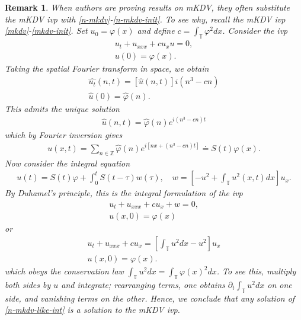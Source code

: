\documentclass[12pt,reqno]{amsart}
\numberwithin{equation}{section}  %
\newcommand{\zz}{\mathbb{Z}}
\newcommand{\ci}{\mathbb{T}}
\newcommand{\wh}{\widehat}
\newcommand{\p}{\partial}
\newcommand{\vp}{\varphi}
\newtheorem{remark}[theorem]{Remark}
\begin{document}
\section{}
\begin{remark}
  When authors are proving results on mKDV, they often substitute the mKDV ivp
  with \eqref{n-mkdv}-\eqref{n-mkdv-init}. To see why, recall the mKDV ivp
  \eqref{mkdv}-\eqref{mkdv-init}. Set $u_{0} = \vp(x)$ and define $c =
  \int_{\ci} \vp^{2} dx$. Consider the ivp
  \begin{gather*}
    u_{t} + u_{xxx} + c u_{x} u = 0,
    \\
    u(0) = \vp(x).
  \end{gather*}
 Taking the spatial Fourier transform in space, we obtain
 \begin{gather*}
   \wh{u_{t}}(n, t) = \left[ \wh{u}(n,t) \right]i\left( n^{3} - cn \right)
   \\
   \wh{u}(0) = \wh{\vp}(n).
 \end{gather*}
 This admits the unique solution
 \begin{equation*}
 \begin{split}
   \wh{u}(n,t) = \wh{\vp}(n) e^{i\left( n^{3} - cn \right)t}
 \end{split}
 \end{equation*}
 which by Fourier inversion gives
 \begin{equation*}
 \begin{split}
   u(x,t) = \sum_{n \in \zz} \wh{\vp}(n) e^{i\left[ nx + \left( n^{3} - cn
   \right)t \right]} \doteq S(t)\vp(x).
 \end{split}
 \end{equation*}
Now consider the integral equation
%
%
\begin{equation}
  \label{n-mkdv-like-int}
\begin{split}
  u(t) = S(t)\vp + \int_{0}^{t} S(t- \tau) w(\tau), \quad w =\left[
  -u^{2} + \int_{\ci} u^{2}(x,t) dx
  \right] u_{x}.
\end{split}
\end{equation}
%
%
By Duhamel's principle, this is the integral formulation of the ivp
\begin{gather*}
  u_{t} + u_{xxx} + c u_{x} + w = 0,
  \\
  u(x,0) = \vp(x)
\end{gather*}
or
\begin{gather*}
  u_{t} + u_{xxx} + c u_{x} = \left[ \int_{\ci} u^{2} dx - u^{2}
  \right]u_{x}
  \\
  u(x,0) = \vp(x).
\end{gather*}
which obeys the conservation law $\int_{\ci}u^{2} dx = \int_{\ci} \vp(x)^{2}
dx$. To see this, multiply both sides by $u$ and integrate; rearranging terms,
one obtains $\p_{t} \int_{\ci} u^{2} dx$ on one side, and vanishing terms on the
other. Hence, we conclude that any solution of \eqref{n-mkdv-like-int} is a
solution to the mKDV ivp. 
  \label{rem:n-mkdv}
\end{remark}
\end{document}
